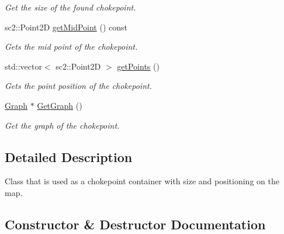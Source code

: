 \begin{DoxyCompactItemize}
\begin{DoxyCompactList}\small\item\em Get the size of the found chokepoint. \end{DoxyCompactList}\item 
sc2\+::\+Point2D \hyperlink{classOverseer_1_1ChokePoint_a5e6621e9c6650cf97873b6770fe7b70c}{get\+Mid\+Point} () const 
\begin{DoxyCompactList}\small\item\em Gets the mid point of the chokepoint. \end{DoxyCompactList}\item 
std\+::vector$<$ sc2\+::\+Point2D $>$ \hyperlink{classOverseer_1_1ChokePoint_a5e6426e4546bfaf9cc622f4e4ab9b842}{get\+Points} ()
\begin{DoxyCompactList}\small\item\em Gets the point position of the chokepoint. \end{DoxyCompactList}\item 
\hyperlink{classOverseer_1_1Graph}{Graph} $\ast$ \hyperlink{classOverseer_1_1ChokePoint_a55a87da8563acfc4e7a55c1d5fae8e83}{Get\+Graph} ()
\begin{DoxyCompactList}\small\item\em Get the graph of the chokepoint. \end{DoxyCompactList}\end{DoxyCompactItemize}


\subsection{Detailed Description}
Class that is used as a chokepoint container with size and positioning on the map. 

\subsection{Constructor \& Destructor Documentation}
